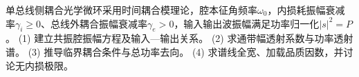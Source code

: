 单总线侧耦合光学微环采用时间耦合模理论，腔本征角频率\(\omega_0\)，内损耗振幅衰减率\(\gamma_i\ge0\)、总线外耦合振幅衰减率\(\gamma_e>0\)，输入输出波振幅满足功率归一化\(|s|^2=P\)。
(1) 建立共振腔振幅方程及输入—输出关系。
(2) 求通带幅透射系数与功率透射谱。
(3) 推导临界耦合条件与总功率去向。
(4) 求谱线全宽、加载品质因数，并讨论无内损极限。
